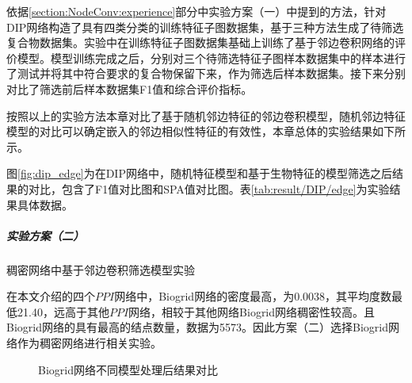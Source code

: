 依据\ref{section:NodeConv:experience}部分中实验方案（一）中提到的方法，针对DIP网络构造了具有四类分类的训练特征子图数据集，基于三种方法生成了待筛选复合物数据集。实验中在训练特征子图数据集基础上训练了基于邻边卷积网络的评价模型。模型训练完成之后，分别对三个待筛选特征子图样本数据集中的样本进行了测试并将其中符合要求的复合物保留下来，作为筛选后样本数据集。接下来分别对比了筛选前后样本数据集F1值和综合评价指标。

按照以上的实验方法本章对比了基于随机邻边特征的邻边卷积模型，随机邻边特征模型的对比可以确定嵌入的邻边相似性特征的有效性，本章总体的实验结果如下所示。

图\ref{fig:dip_edge}为在DIP网络中，随机特征模型和基于生物特征的模型筛选之后结果的对比，包含了F1值对比图和SPA值对比图。表\ref{tab:result/DIP/edge}为实验结果具体数据。


\subparagraph*{实验方案（二）} 稠密网络中基于邻边卷积筛选模型实验

在本文介绍的四个$PPI$网络中，Biogrid网络的密度最高，为0.0038，其平均度数最低21.40，远高于其他$PPI$网络，相较于其他网络Biogrid网络稠密性较高。且Biogrid网络的具有最高的结点数量，数据为5573。因此方案（二）选择Biogrid网络作为稠密网络进行相关实验。


\begin{figure}[htbp]
    \centering
    \vskip0.2cm
    \caption{Biogrid网络不同模型处理后结果对比}
    \label{fig:biogrid_edge}
\end{figure}

